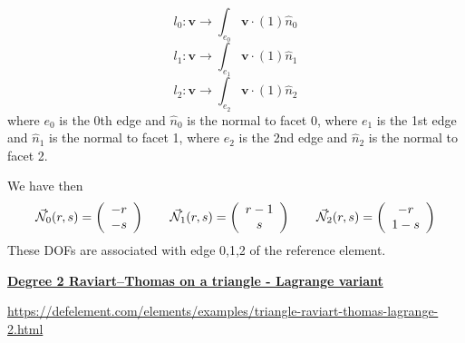 \[
l_0: {\bm v} \rightarrow \int_{e_0} {\bm v} \cdot (1) \hat{n}_0
\]
\[
l_1: {\bm v} \rightarrow \int_{e_1} {\bm v} \cdot (1) \hat{n}_1
\]
\[
l_2: {\bm v} \rightarrow \int_{e_2} {\bm v} \cdot (1) \hat{n}_2
\]
where $e_0$ is the 0th edge and $\hat{n}_0$ is the normal to facet 0,
where $e_1$ is the 1st edge and $\hat{n}_1$ is the normal to facet 1,
where $e_2$ is the 2nd edge and $\hat{n}_2$ is the normal to facet 2.

We have then
\[
\vec{{\mathcal{N}}}_0(r,s) = \left( \begin{array}{c} -r\\-s  \end{array} \right)
\qquad
\vec{{\mathcal{N}}}_1(r,s) = \left( \begin{array}{c} r-1\\s  \end{array} \right)
\qquad
\vec{{\mathcal{N}}}_2(r,s) = \left( \begin{array}{c} -r \\ 1-s  \end{array} \right)
\]
These DOFs are associated with edge 0,1,2 of the reference element.

\vspace{.5cm}
\noindent
\underline{\bf Degree 2 Raviart–Thomas on a triangle - Lagrange variant}

\url{https://defelement.com/elements/examples/triangle-raviart-thomas-lagrange-2.html}

